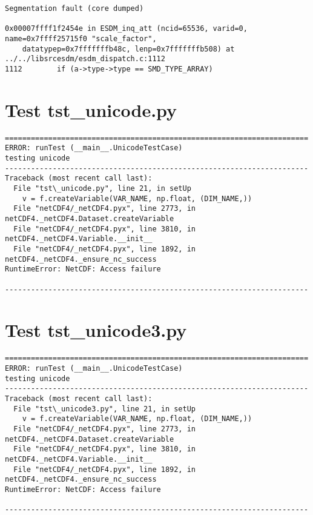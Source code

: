 \begin{verbatim}
Segmentation fault (core dumped)

0x00007ffff1f2454e in ESDM_inq_att (ncid=65536, varid=0, name=0x7ffff25715f0 "scale_factor",
    datatypep=0x7fffffffb48c, lenp=0x7fffffffb508) at ../../libsrcesdm/esdm_dispatch.c:1112
1112	    if (a->type->type == SMD_TYPE_ARRAY)
\end{verbatim}

\section{Test tst\_unicode.py}

\begin{verbatim}
======================================================================
ERROR: runTest (__main__.UnicodeTestCase)
testing unicode
----------------------------------------------------------------------
Traceback (most recent call last):
  File "tst\_unicode.py", line 21, in setUp
    v = f.createVariable(VAR_NAME, np.float, (DIM_NAME,))
  File "netCDF4/_netCDF4.pyx", line 2773, in netCDF4._netCDF4.Dataset.createVariable
  File "netCDF4/_netCDF4.pyx", line 3810, in netCDF4._netCDF4.Variable.__init__
  File "netCDF4/_netCDF4.pyx", line 1892, in netCDF4._netCDF4._ensure_nc_success
RuntimeError: NetCDF: Access failure

----------------------------------------------------------------------
\end{verbatim}

\section{Test tst\_unicode3.py}

\begin{verbatim}
======================================================================
ERROR: runTest (__main__.UnicodeTestCase)
testing unicode
----------------------------------------------------------------------
Traceback (most recent call last):
  File "tst\_unicode3.py", line 21, in setUp
    v = f.createVariable(VAR_NAME, np.float, (DIM_NAME,))
  File "netCDF4/_netCDF4.pyx", line 2773, in netCDF4._netCDF4.Dataset.createVariable
  File "netCDF4/_netCDF4.pyx", line 3810, in netCDF4._netCDF4.Variable.__init__
  File "netCDF4/_netCDF4.pyx", line 1892, in netCDF4._netCDF4._ensure_nc_success
RuntimeError: NetCDF: Access failure

----------------------------------------------------------------------
\end{verbatim}

